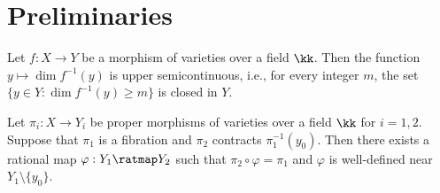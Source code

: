 \section{Preliminaries}

\begin{proposition}\label{prop:upper semicontinuity of fiber dimension}
    Let \(f: X \to Y\) be a morphism of varieties over a field \(\kk\).
    Then the function \(y \mapsto \dim f^{-1}(y)\) is upper semicontinuous, i.e., for every integer \(m\), the set \(\{y \in Y: \dim f^{-1}(y) \geq m\}\) is closed in \(Y\).
\end{proposition}

\begin{theorem}\label{thm: Rigidity Lemma}
    Let \(\pi_i: X \to Y_i\) be proper morphisms of varieties over a field \(\kk\) for \(i=1,2\).
    Suppose that \(\pi_1\) is a fibration and \(\pi_2\) contracts \(\pi_1^{-1}(y_0)\).
    Then there exists a rational map \(\varphi: Y_1 \ratmap Y_2\) such that \(\pi_2 \circ \varphi = \pi_1\) and \(\varphi\) is well-defined near \(Y_1 \setminus \{y_0\}\). 
\end{theorem}